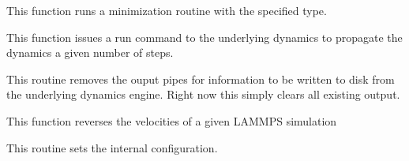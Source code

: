 \documentclass[letterpaper,10pt,english]{sphinxmanual}
\begin{document}
\begin{fulllineitems}
\begin{fulllineitems}
\end{fulllineitems}


\begin{fulllineitems}
\label{walker_api/walker_api.doc:lammpsWalker.lammpsWalker.minimize}
This function runs a minimization routine with the specified type.

\end{fulllineitems}


\begin{fulllineitems}
\label{walker_api/walker_api.doc:lammpsWalker.lammpsWalker.propagate}
This function issues a run command to the underlying dynamics to propagate
the dynamics a given number of steps.

\end{fulllineitems}


\begin{fulllineitems}
\label{walker_api/walker_api.doc:lammpsWalker.lammpsWalker.removeOutput}
This routine removes the ouput pipes for information to be written to disk from the underlying dynamics engine. Right now this simply clears all existing output.

\end{fulllineitems}


\begin{fulllineitems}
\label{walker_api/walker_api.doc:lammpsWalker.lammpsWalker.reverseVel}
This function reverses the velocities of a given LAMMPS simulation

\end{fulllineitems}


\begin{fulllineitems}
\label{walker_api/walker_api.doc:lammpsWalker.lammpsWalker.setConfig}
This routine sets the internal configuration.


\end{fulllineitems}
\end{fulllineitems}
\end{document}
